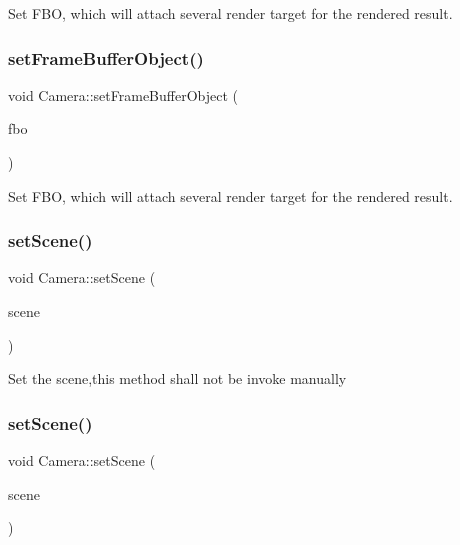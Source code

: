 Set F\+BO, which will attach several render target for the rendered result. \mbox{\label{classCamera_a17b4f5537c83a29f8a7d809859e690a4}} 
\subsubsection{\texorpdfstring{set\+Frame\+Buffer\+Object()}{setFrameBufferObject()}\hspace{0.1cm}{\footnotesize\ttfamily [2/2]}}
{\footnotesize\ttfamily void Camera\+::set\+Frame\+Buffer\+Object (\begin{DoxyParamCaption}\item[{\hyperlink{classexperimental_1_1FrameBuffer}{experimental\+::\+Frame\+Buffer} $\ast$}]{fbo }\end{DoxyParamCaption})}

Set F\+BO, which will attach several render target for the rendered result. \mbox{\label{classCamera_ac35b13397b0add2c502bef10a46f0e17}} 
\subsubsection{\texorpdfstring{set\+Scene()}{setScene()}\hspace{0.1cm}{\footnotesize\ttfamily [1/2]}}
{\footnotesize\ttfamily void Camera\+::set\+Scene (\begin{DoxyParamCaption}\item[{\hyperlink{classScene}{Scene} $\ast$}]{scene }\end{DoxyParamCaption})}

Set the scene,this method shall not be invoke manually \mbox{\label{classCamera_ac35b13397b0add2c502bef10a46f0e17}} 
\subsubsection{\texorpdfstring{set\+Scene()}{setScene()}\hspace{0.1cm}{\footnotesize\ttfamily [2/2]}}
{\footnotesize\ttfamily void Camera\+::set\+Scene (\begin{DoxyParamCaption}\item[{\hyperlink{classScene}{Scene} $\ast$}]{scene }\end{DoxyParamCaption})}

